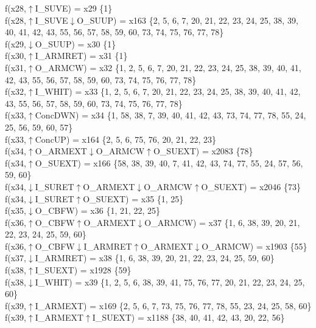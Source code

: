 f(x28,$\uparrow$I\_SUVE) = x29 \{1\} \\  
f(x28,$\uparrow$I\_SUVE$\downarrow$O\_SUUP) = x163 \{2, 5, 6, 7, 20, 21, 22, 23, 24, 25, 38, 39, 40, 41, 42, 43, 55, 56, 57, 58, 59, 60, 73, 74, 75, 76, 77, 78\} \\  
f(x29,$\downarrow$O\_SUUP) = x30 \{1\} \\  
f(x30,$\uparrow$I\_ARMRET) = x31 \{1\} \\  
f(x31,$\uparrow$O\_ARMCW) = x32 \{1, 2, 5, 6, 7, 20, 21, 22, 23, 24, 25, 38, 39, 40, 41, 42, 43, 55, 56, 57, 58, 59, 60, 73, 74, 75, 76, 77, 78\} \\  
f(x32,$\uparrow$I\_WHIT) = x33 \{1, 2, 5, 6, 7, 20, 21, 22, 23, 24, 25, 38, 39, 40, 41, 42, 43, 55, 56, 57, 58, 59, 60, 73, 74, 75, 76, 77, 78\} \\  
f(x33,$\uparrow$ConcDWN) = x34 \{1, 58, 38, 7, 39, 40, 41, 42, 43, 73, 74, 77, 78, 55, 24, 25, 56, 59, 60, 57\} \\  
f(x33,$\uparrow$ConcUP) = x164 \{2, 5, 6, 75, 76, 20, 21, 22, 23\} \\  
f(x34,$\uparrow$O\_ARMEXT$\downarrow$O\_ARMCW$\uparrow$O\_SUEXT) = x2083 \{78\} \\  
f(x34,$\uparrow$O\_SUEXT) = x166 \{58, 38, 39, 40, 7, 41, 42, 43, 74, 77, 55, 24, 57, 56, 59, 60\} \\  
f(x34,$\downarrow$I\_SURET$\uparrow$O\_ARMEXT$\downarrow$O\_ARMCW$\uparrow$O\_SUEXT) = x2046 \{73\} \\  
f(x34,$\downarrow$I\_SURET$\uparrow$O\_SUEXT) = x35 \{1, 25\} \\  
f(x35,$\downarrow$O\_CBFW) = x36 \{1, 21, 22, 25\} \\  
f(x36,$\uparrow$O\_CBFW$\uparrow$O\_ARMEXT$\downarrow$O\_ARMCW) = x37 \{1, 6, 38, 39, 20, 21, 22, 23, 24, 25, 59, 60\} \\  
f(x36,$\uparrow$O\_CBFW$\downarrow$I\_ARMRET$\uparrow$O\_ARMEXT$\downarrow$O\_ARMCW) = x1903 \{55\} \\  
f(x37,$\downarrow$I\_ARMRET) = x38 \{1, 6, 38, 39, 20, 21, 22, 23, 24, 25, 59, 60\} \\  
f(x38,$\uparrow$I\_SUEXT) = x1928 \{59\} \\  
f(x38,$\downarrow$I\_WHIT) = x39 \{1, 2, 5, 6, 38, 39, 41, 75, 76, 77, 20, 21, 22, 23, 24, 25, 60\} \\  
f(x39,$\uparrow$I\_ARMEXT) = x169 \{2, 5, 6, 7, 73, 75, 76, 77, 78, 55, 23, 24, 25, 58, 60\} \\  
f(x39,$\uparrow$I\_ARMEXT$\uparrow$I\_SUEXT) = x1188 \{38, 40, 41, 42, 43, 20, 22, 56\} \\  
